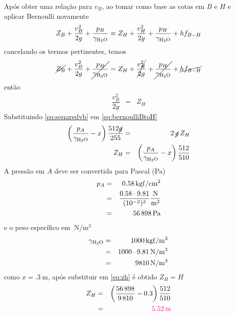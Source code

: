 \documentclass[a4paper, 12pt, brazilian]{article}
\begin{document}
	Após obter uma relação para $v_{B}$, ao tomar como base as cotas em $B$ e $H$ e aplicar Bernoulli novamente
	\begin{equation}
			Z_{B}+\dfrac{v_{B}^{2}}{2g}+\dfrac{p_{B}}{\gamma_{\ce{H2O}}}=Z_{H}+\dfrac{v_{H}^{2}}{2g}+\dfrac{p_{H}}{\gamma_{\ce{H2O}}}+hf_{B-H}
	\end{equation}
	cancelando os termos pertinentes, temos
	\begin{equation}
		\cancel{Z_{B}}+\dfrac{v_{B}^{2}}{2g}+\cancel{\dfrac{p_{B}}{\gamma_{\ce{H2O}}}}=Z_{H}+\cancel{\dfrac{v_{H}^{2}}{2g}}+\cancel{\dfrac{p_{H}}{\gamma_{\ce{H2O}}}}+\cancel{hf_{B-H}}
	\end{equation}
	então
	\begin{eqnarray}
		\label{eq:bernoulliBtoH}
		\dfrac{v_{B}^{2}}{2g}&=&Z_{H}
	\end{eqnarray}
	Substituindo \eqref{eq:squaredvb} em \eqref{eq:bernoulliBtoH}
	\begin{eqnarray}
		\left(\dfrac{p_{A}}{\gamma_{\ce{H2O}}}-x\right)\dfrac{512\cancel{g}}{255}&=&2\,\cancel{g}\,Z_{H}\\
		Z_{H}&=&\left(\dfrac{p_{A}}{\gamma_{\ce{H2O}}}-x\right)\dfrac{512}{510}\label{eq:zh}
	\end{eqnarray}
	A pressão em $A$ deve ser convertida para Pascal (Pa)
	\begin{eqnarray}
		p_{A}&=&\SI{.58}{\kilogram f/\centi\meter^{2}}\\
			 &=&\dfrac{0.58\cdot 9.81}{(10^{-2})^{2}}\SI{}{\dfrac{\newton}{\meter^{2}}}\\
			 &=&\SI{56898}{\pascal}
	\end{eqnarray}
	e o peso específico em $\SI{}{\newton/\meter^{3}}$
	\begin{eqnarray}
		\gamma_{\ce{H2O}}&=&\SI{1000}{\kilogram f/\meter^{3}}\\
						 &=&1000\cdot 9.81\,\SI{}{\newton/\meter^{3}}\\
						 &=&\SI{9810}{\newton/\meter^{3}}
	\end{eqnarray}
	como $x=\SI{.3}{\meter}$, após substituir em \eqref{eq:zh} é obtido $Z_{H}=H$
	\begin{eqnarray}
		Z_{H}&=&\left(\dfrac{56\,898}{9\,810}-0.3\right)\dfrac{512}{510}\\
			 &=&\textcolor{magenta}{\SI{5.52}{\meter}}
	\end{eqnarray}
\end{document}
